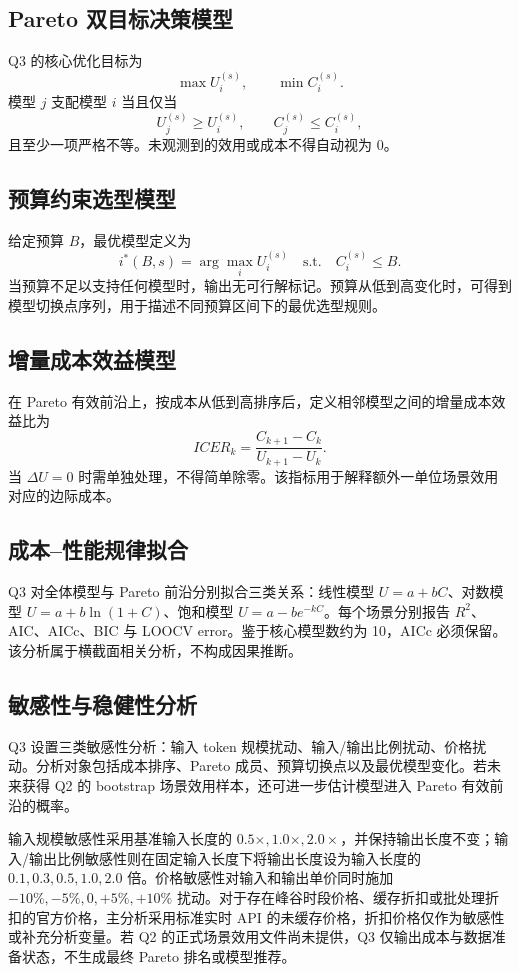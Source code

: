 \subsection{Pareto 双目标决策模型}

Q3 的核心优化目标为
\[
\max U_i^{(s)}, \qquad \min C_i^{(s)}.
\]
模型 $j$ 支配模型 $i$ 当且仅当
\[
U_j^{(s)} \ge U_i^{(s)}, \qquad C_j^{(s)} \le C_i^{(s)},
\]
且至少一项严格不等。未观测到的效用或成本不得自动视为 0。

\subsection{预算约束选型模型}

给定预算 $B$，最优模型定义为
\[
i^*(B,s)=\arg\max_i U_i^{(s)} \quad \text{s.t.}\quad C_i^{(s)}\le B.
\]
当预算不足以支持任何模型时，输出无可行解标记。预算从低到高变化时，可得到模型切换点序列，用于描述不同预算区间下的最优选型规则。

\subsection{增量成本效益模型}

在 Pareto 有效前沿上，按成本从低到高排序后，定义相邻模型之间的增量成本效益比为
\[
ICER_k = \frac{C_{k+1}-C_k}{U_{k+1}-U_k}.
\]
当 $\Delta U=0$ 时需单独处理，不得简单除零。该指标用于解释额外一单位场景效用对应的边际成本。

\subsection{成本--性能规律拟合}

Q3 对全体模型与 Pareto 前沿分别拟合三类关系：线性模型 $U=a+bC$、对数模型 $U=a+b\ln(1+C)$、饱和模型 $U=a-be^{-kC}$。每个场景分别报告 $R^2$、AIC、AICc、BIC 与 LOOCV error。鉴于核心模型数约为 10，AICc 必须保留。该分析属于横截面相关分析，不构成因果推断。

\subsection{敏感性与稳健性分析}

Q3 设置三类敏感性分析：输入 token 规模扰动、输入/输出比例扰动、价格扰动。分析对象包括成本排序、Pareto 成员、预算切换点以及最优模型变化。若未来获得 Q2 的 bootstrap 场景效用样本，还可进一步估计模型进入 Pareto 有效前沿的概率。

输入规模敏感性采用基准输入长度的 $0.5\times,1.0\times,2.0\times$，并保持输出长度不变；输入/输出比例敏感性则在固定输入长度下将输出长度设为输入长度的 $0.1,0.3,0.5,1.0,2.0$ 倍。价格敏感性对输入和输出单价同时施加 $-10\%,-5\%,0,+5\%,+10\%$ 扰动。对于存在峰谷时段价格、缓存折扣或批处理折扣的官方价格，主分析采用标准实时 API 的未缓存价格，折扣价格仅作为敏感性或补充分析变量。若 Q2 的正式场景效用文件尚未提供，Q3 仅输出成本与数据准备状态，不生成最终 Pareto 排名或模型推荐。

